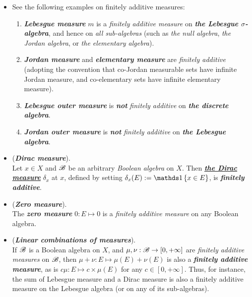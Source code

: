 \documentclass[11pt]{article}
\begin{document}
\begin{itemize}
\item \begin{example}
See the following examples on finitely additive measures:
\begin{enumerate}
\item \emph{\textbf{Lebesgue measure}} $m$ is a \emph{finitely additive measure} on \emph{\textbf{the Lebesgue $\sigma$-algebra}}, and hence on \emph{all sub-algebras} (such as \emph{the null algebra}, \emph{the Jordan algebra}, or \emph{the elementary algebra}).

\item \emph{\textbf{Jordan measure}} and \emph{\textbf{elementary measure}} are \emph{finitely additive} (adopting the convention that co-Jordan measurable sets have infinite Jordan measure, and co-elementary sets have infinite elementary measure).

\item \emph{\textbf{Lebesgue outer measure}} is \emph{\textbf{not}} \emph{finitely additive} on \emph{\textbf{the discrete algebra}}.

\item \emph{\textbf{Jordan outer measure}} is \emph{\textbf{not}} \emph{finitely additive} on \emph{\textbf{the Lebesgue algebra}}.
\end{enumerate}
\end{example}

\item  \begin{example} (\emph{\textbf{Dirac measure}}). \\
Let $x \in X$ and ${\mathscr B}$ be an arbitrary \emph{Boolean algebra} on $X$. Then \underline{\emph{\textbf{the Dirac measure}}} $\delta_x$ at $x$, defined by
setting $\delta_x(E) := \ind{x \in E}$, is \emph{\textbf{finitely additive}}.
\end{example}

\item \begin{example} (\emph{\textbf{Zero measure}}). \\
The \emph{\textbf{zero measure}} $0: E \mapsto 0$ is a \emph{finitely additive measure} on any Boolean algebra.
\end{example}

\item \begin{example} (\emph{\textbf{Linear combinations of measures}}). \\
If ${\mathscr B}$ is a Boolean algebra on $X$, and $\mu, \nu: {\mathscr B} \rightarrow [0, +\infty]$ are \emph{finitely additive measures} on ${\mathscr B}$, then $\mu + \nu: E \mapsto \mu(E)+ \nu(E)$ is also a \emph{\textbf{finitely additive measure}}, as is $c\mu: E \mapsto c \times \mu(E)$ for any $c \in [0, +\infty]$. Thus, for instance, the sum of Lebesgue measure and a Dirac measure is also a finitely additive measure on the Lebesgue algebra (or on any of its sub-algebras).


\end{example}
\end{itemize}
\end{document}
